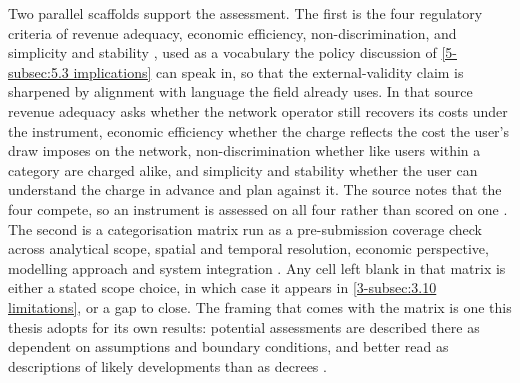 Two parallel scaffolds support the assessment. The first is the four regulatory criteria of revenue adequacy, economic efficiency, non-discrimination, and simplicity and stability \cite{bergaentzle_electricity_2019}, used as a vocabulary the policy discussion of \autoref{5-subsec:5.3 implications} can speak in, so that the external-validity claim is sharpened by alignment with language the field already uses. In that source revenue adequacy asks whether the network operator still recovers its costs under the instrument, economic efficiency whether the charge reflects the cost the user's draw imposes on the network, non-discrimination whether like users within a category are charged alike, and simplicity and stability whether the user can understand the charge in advance and plan against it. The source notes that the four compete, so an instrument is assessed on all four rather than scored on one \cite{bergaentzle_electricity_2019}. The second is a categorisation matrix run as a pre-submission coverage check across analytical scope, spatial and temporal resolution, economic perspective, modelling approach and system integration \cite{atabaki_systematic_2025}. Any cell left blank in that matrix is either a stated scope choice, in which case it appears in \autoref{3-subsec:3.10 limitations}, or a gap to close. The framing that comes with the matrix is one this thesis adopts for its own results: potential assessments are described there as dependent on assumptions and boundary conditions, and better read as descriptions of likely developments than as decrees \cite{atabaki_systematic_2025}.

